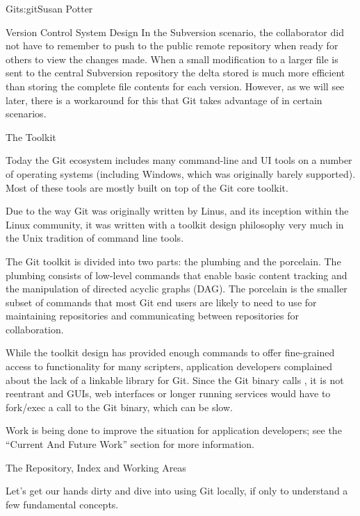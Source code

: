 \begin{aosachapter}{Git}{s:git}{Susan Potter}
\begin{aosasect1}{Version Control System Design}
In the Subversion scenario, the collaborator did not have to remember
to push to the public remote repository when ready for others to
view the changes made. When a small modification to a larger file is sent
to the central Subversion repository the delta stored is much more
efficient than storing the complete file contents for each version.
However, as we will see later, there is a workaround for this that Git
takes advantage of in certain scenarios.

\end{aosasect1}

\begin{aosasect1}{The Toolkit}

Today the Git ecosystem includes many command-line and UI tools on a number
of operating systems (including Windows, which was originally barely
supported). Most of these tools are mostly built on top of the Git core
toolkit.

Due to the way Git was originally written by Linus, and its inception within
the Linux community, it was written with a toolkit design philosophy very much
in the Unix tradition of command line tools.

The Git toolkit is divided into two parts: the plumbing and
the porcelain. The plumbing consists of low-level commands that enable
basic content tracking and
the manipulation of directed acyclic graphs (DAG). The porcelain is 
the smaller subset of  commands that most
Git end users are likely to need to use for maintaining repositories and
communicating between repositories for collaboration.

While the toolkit design has provided enough commands to offer fine-grained
access to functionality for many scripters, application developers
complained about the lack of a linkable library for Git. Since the Git binary
calls , it is not reentrant and GUIs, web interfaces or longer
running services would have to fork/exec a call to the Git binary, which can
be slow.

Work is being done to improve the situation for application developers; see
the ``Current And Future Work'' section for more information.
\end{aosasect1}

\begin{aosasect1}{The Repository, Index and Working Areas}

Let's get our hands dirty and dive into using Git locally, if only to
understand a few fundamental concepts.


\end{aosasect1}
\end{aosachapter}
